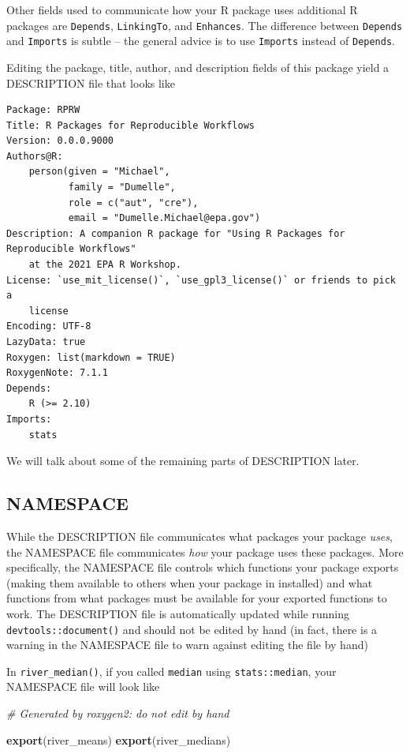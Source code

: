 \documentclass[
]{book}
\newenvironment{Shaded}{\begin{snugshade}}{\end{snugshade}}
\newcommand{\CommentTok}[1]{\textcolor[rgb]{0.56,0.35,0.01}{\textit{#1}}}
\newcommand{\KeywordTok}[1]{\textcolor[rgb]{0.13,0.29,0.53}{\textbf{#1}}}
\newcommand{\NormalTok}[1]{#1}
\begin{document}
Other fields used to communicate how your R package uses additional R packages are \texttt{Depends}, \texttt{LinkingTo}, and \texttt{Enhances}. The difference between \texttt{Depends} and \texttt{Imports} is subtle -- the general advice is to use \texttt{Imports} instead of \texttt{Depends}.

Editing the package, title, author, and description fields of this package yield a DESCRIPTION file that looks like

\begin{verbatim}
Package: RPRW
Title: R Packages for Reproducible Workflows
Version: 0.0.0.9000
Authors@R: 
    person(given = "Michael",
           family = "Dumelle",
           role = c("aut", "cre"),
           email = "Dumelle.Michael@epa.gov")
Description: A companion R package for "Using R Packages for Reproducible Workflows"
    at the 2021 EPA R Workshop.
License: `use_mit_license()`, `use_gpl3_license()` or friends to pick a
    license
Encoding: UTF-8
LazyData: true
Roxygen: list(markdown = TRUE)
RoxygenNote: 7.1.1
Depends: 
    R (>= 2.10)
Imports: 
    stats
\end{verbatim}

We will talk about some of the remaining parts of DESCRIPTION later.

\hypertarget{namespace}{%
\subsection{NAMESPACE}\label{namespace}}

While the DESCRIPTION file communicates what packages your package \emph{uses}, the NAMESPACE file communicates \emph{how} your package uses these packages. More specifically, the NAMESPACE file controls which functions your package exports (making them available to others when your package in installed) and what functions from what packages must be available for your exported functions to work. The DESCRIPTION file is automatically updated while running \texttt{devtools::document()} and should not be edited by hand (in fact, there is a warning in the NAMESPACE file to warn against editing the file by hand)

In \texttt{river\_median()}, if you called \texttt{median} using \texttt{stats::median}, your NAMESPACE file will look like

\begin{Shaded}
\begin{Highlighting}[]
\CommentTok{# Generated by roxygen2: do not edit by hand}

\KeywordTok{export}\NormalTok{(river_means)}
\KeywordTok{export}\NormalTok{(river_medians)}
\end{Highlighting}
\end{Shaded}
\end{document}
